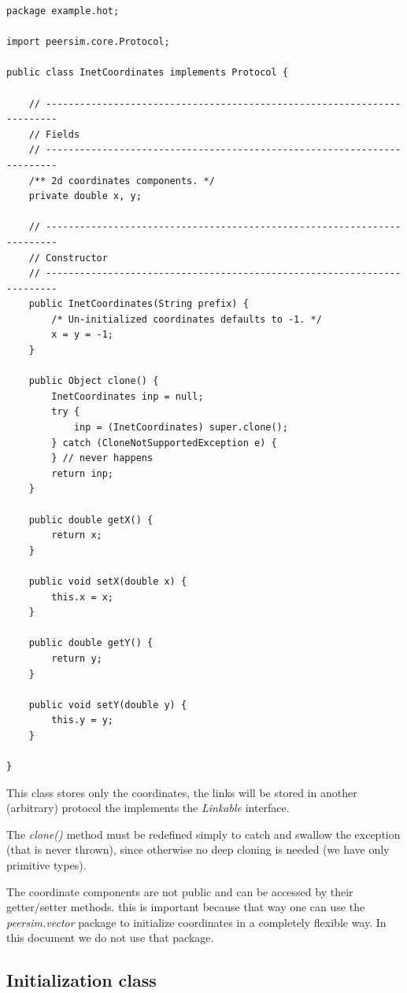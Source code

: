 \documentclass[a4paper,11pt]{article}
\begin{document}
\footnotesize
\begin{verbatim}
package example.hot;

import peersim.core.Protocol;

public class InetCoordinates implements Protocol {

    // ------------------------------------------------------------------------
    // Fields
    // ------------------------------------------------------------------------
    /** 2d coordinates components. */
    private double x, y;

    // ------------------------------------------------------------------------
    // Constructor
    // ------------------------------------------------------------------------
    public InetCoordinates(String prefix) {
        /* Un-initialized coordinates defaults to -1. */
        x = y = -1;
    }

    public Object clone() {
        InetCoordinates inp = null;
        try {
            inp = (InetCoordinates) super.clone();
        } catch (CloneNotSupportedException e) {
        } // never happens
        return inp;
    }

    public double getX() {
        return x;
    }

    public void setX(double x) {
        this.x = x;
    }

    public double getY() {
        return y;
    }

    public void setY(double y) {
        this.y = y;
    }

}
\end{verbatim}
\normalsize

This class stores only the coordinates, the links will be stored in another
(arbitrary) protocol the implements the 
\emph{Linkable} interface.

The \emph{clone()} method must be redefined simply to catch and swallow
the exception (that is never thrown),
since otherwise no deep cloning is needed (we have only primitive types).

The coordinate components are not public and can be accessed by their
getter/setter methods.
this is important because that way one can use the \emph{peersim.vector}
package to initialize coordinates in a completely flexible way.
In this document we do not use that package.

\subsection{Initialization class}
\label{s:init}
\end{document}
